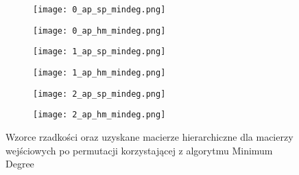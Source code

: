 \documentclass{../myclass}
\begin{document}
\begin{figure}
    \centering
    \begin{subfigure}[b]{0.45\textwidth}
        \centering
        \texttt{[image: 0\_ap\_sp\_mindeg.png]}
    \end{subfigure}
    \hfill
    \begin{subfigure}[b]{0.45\textwidth}
        \centering
        \texttt{[image: 0\_ap\_hm\_mindeg.png]}
    \end{subfigure}
    \vfill
    \centering
    \begin{subfigure}[b]{0.45\textwidth}
        \centering
        \texttt{[image: 1\_ap\_sp\_mindeg.png]}
    \end{subfigure}
    \hfill
    \begin{subfigure}[b]{0.45\textwidth}
        \centering
        \texttt{[image: 1\_ap\_hm\_mindeg.png]}
    \end{subfigure}
    \vfill
    \centering
    \begin{subfigure}[b]{0.45\textwidth}
        \centering
        \texttt{[image: 2\_ap\_sp\_mindeg.png]}
    \end{subfigure}
    \hfill
    \begin{subfigure}[b]{0.45\textwidth}
        \centering
        \texttt{[image: 2\_ap\_hm\_mindeg.png]}
    \end{subfigure}
    \caption{Wzorce rzadkości oraz uzyskane macierze hierarchiczne dla macierzy wejściowych po permutacji korzystającej z algorytmu Minimum Degree}
    \label{Fig:2}
\end{figure}
\end{document}
